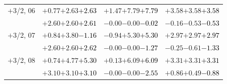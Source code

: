 \documentclass[compress]{beamer}
\begin{document}
\begin{frame}
\begin{tabular}{r | c | c | c}
$+$3/2, 06 & $+0.77$\hspace{0.1 cm}$+2.63$\hspace{0.1 cm}\textcolor{black}{$+2.63$} & $+1.47$\hspace{0.1 cm}$+7.79$\hspace{0.1 cm}\textcolor{black}{$+7.79$} & $+3.58$\hspace{0.1 cm}$+3.58$\hspace{0.1 cm}\textcolor{black}{$+3.58$} \\
           & $+2.60$\hspace{0.1 cm}$+2.60$\hspace{0.1 cm}\textcolor{black}{$+2.61$} & $-0.00$\hspace{0.1 cm}$-0.00$\hspace{0.1 cm}\textcolor{black}{$-0.02$} & $-0.16$\hspace{0.1 cm}$-0.53$\hspace{0.1 cm}\textcolor{black}{$-0.53$} \\
$+$3/2, 07 & $+0.84$\hspace{0.1 cm}$+3.80$\hspace{0.1 cm}\textcolor{black}{$-1.16$} & $-0.94$\hspace{0.1 cm}$+5.30$\hspace{0.1 cm}\textcolor{black}{$+5.30$} & $+2.97$\hspace{0.1 cm}$+2.97$\hspace{0.1 cm}\textcolor{black}{$+2.97$} \\
           & $+2.60$\hspace{0.1 cm}$+2.60$\hspace{0.1 cm}\textcolor{black}{$+2.62$} & $-0.00$\hspace{0.1 cm}$-0.00$\hspace{0.1 cm}\textcolor{black}{$-1.27$} & $-0.25$\hspace{0.1 cm}$-0.61$\hspace{0.1 cm}\textcolor{black}{$-1.33$} \\
$+$3/2, 08 & $+0.74$\hspace{0.1 cm}$+4.77$\hspace{0.1 cm}\textcolor{black}{$+5.30$} & $+0.13$\hspace{0.1 cm}$+6.09$\hspace{0.1 cm}\textcolor{black}{$+6.09$} & $+3.31$\hspace{0.1 cm}$+3.31$\hspace{0.1 cm}\textcolor{black}{$+3.31$} \\
           & $+3.10$\hspace{0.1 cm}$+3.10$\hspace{0.1 cm}\textcolor{black}{$+3.10$} & $-0.00$\hspace{0.1 cm}$-0.00$\hspace{0.1 cm}\textcolor{black}{$-2.55$} & $+0.86$\hspace{0.1 cm}$+0.49$\hspace{0.1 cm}\textcolor{black}{$-0.88$} \\

\end{tabular}
\end{frame}
\end{document}
